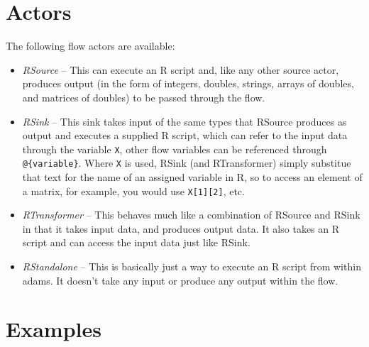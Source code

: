 \documentclass[a4paper]{book}
\begin{document}
\section{Actors}
The following flow actors are available:
\begin{itemize}
	\item \textit{RSource} -- This can execute an R script and, like any other
	source actor, produces output (in the form of integers, doubles, strings,
	arrays of doubles, and matrices of doubles) to be passed through the flow.
	\item \textit{RSink} -- This sink takes input of the same types that RSource
	produces as output and executes a supplied R script, which can refer to the
	input data through the variable \verb|X|, other flow variables can be
	referenced through \verb|@{variable}|.
	Where \verb|X| is used, RSink (and RTransformer) simply substitue that text for the name of an assigned variable
	in R, so to access an element of a matrix, for example, you would use
	\verb|X[1][2]|, etc.
	\item \textit{RTransformer} -- This behaves much like a combination of RSource
	and RSink in that it takes input data, and produces output data. It also takes
	an R script and can access the input data just like RSink.
	\item \textit{RStandalone} -- This is basically just a way to execute an R
	script from within adams. It doesn't take any input or produce any output
	within the flow.
\end{itemize}

\newpage
\section{Examples}
\end{document}
